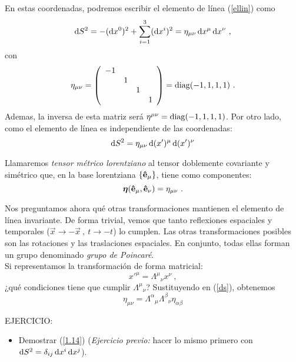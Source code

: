 En estas coordenadas, podremos escribir el elemento de línea (\ref{ellin}) como
\begin{equation}\label{ds}
    \D{S}^2 = - (\D{x}^0)^2 + \sum_{i=1}^3 (\D{x}^i)^2 = \eta_{\mu \nu} \D{x^\mu ,x^\nu }\ ,
\end{equation}
con 
$$
\eta_{\mu \nu } = \left ( \begin{array}{cccc}
    -1 &&&  \\
     &1&&\\
     &&1&\\
     &&&1
\end{array} \right )=\operatorname{diag}(-1,1,1,1) \ .
$$
Ademas, la inversa de esta matriz será $\eta^{\mu \nu } = \operatorname{diag}(-1,1,1,1)$. Por otro lado, como el elemento de línea es independiente de las coordenadas:
$$
\D{S}^2 = \eta_{\mu \nu } \D{(x')^\mu , (x')^\nu }
$$
\begin{define}
    Llamaremos \emph{tensor métrico lorentziano} al tensor doblemente covariante y simétrico que, en la base lorentziana $\{ \mathbf{\hat{e}}_\mu  \}$, tiene como componentes:
    \begin{equation}
        \bm{\eta}(\mathbf{\hat{e}}_\mu,\mathbf{\hat{e}}_\nu ) = \eta_{\mu \nu} \ .
    \end{equation}
\end{define}

Nos preguntamos ahora qué otras transformaciones mantienen el elemento de línea invariante. De forma trivial, vemos que tanto reflexiones espaciales y temporales ($\vec{x}\to -\vec{x}\ , \ t\to -t$) lo cumplen. Las otras transformaciones posibles son las rotaciones y las traslaciones espaciales. En conjunto, todas ellas forman un grupo denominado \emph{grupo de Poincaré}. \\

Si representamos la transformación de forma matricial:
$$
x'^\mu = \Lambda ^\mu {}_\nu x^\nu \ ,
$$
¿qué condiciones tiene que cumplir $\Lambda ^\mu {}_\nu $? Sustituyendo en (\ref{ds}), obtenemos 
\begin{equation}
    \boxed{\eta_{\mu \nu } = \Lambda ^\alpha {}_\mu \Lambda ^\beta {}_\nu \eta_{\alpha \beta }} \label{1.14}
\end{equation}
\begin{mybox}
    EJERCICIO: 
    \begin{itemize}
        \item Demostrar (\ref{1.14}) (\emph{Ejercicio previo:} hacer lo mismo primero con $\D{S}^2=\delta_{ij}\D{x^i,x^j}$).
    \end{itemize}
\end{mybox}
